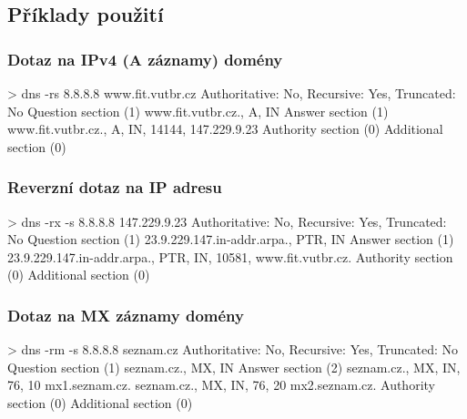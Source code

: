 \documentclass[a4paper,12pt]{article}
\begin{document}
\newpage
\subsection{Příklady použití}
\subsubsection{Dotaz na IPv4 (A záznamy) domény}
\begin{cppcode}
> dns -rs 8.8.8.8 www.fit.vutbr.cz
Authoritative: No, Recursive: Yes, Truncated: No
Question section (1)
  www.fit.vutbr.cz., A, IN
Answer section (1)
  www.fit.vutbr.cz., A, IN, 14144, 147.229.9.23
Authority section (0)
Additional section (0)
\end{cppcode}

\subsubsection{Reverzní dotaz na IP adresu}
\begin{cppcode}
> dns -rx -s 8.8.8.8 147.229.9.23
Authoritative: No, Recursive: Yes, Truncated: No
Question section (1)
  23.9.229.147.in-addr.arpa., PTR, IN
Answer section (1)
  23.9.229.147.in-addr.arpa., PTR, IN, 10581, www.fit.vutbr.cz.
Authority section (0)
Additional section (0)
\end{cppcode}

\subsubsection{Dotaz na MX záznamy domény}
\begin{cppcode}
> dns -rm -s 8.8.8.8 seznam.cz
Authoritative: No, Recursive: Yes, Truncated: No
Question section (1)
  seznam.cz., MX, IN
Answer section (2)
  seznam.cz., MX, IN, 76, 10 mx1.seznam.cz.
  seznam.cz., MX, IN, 76, 20 mx2.seznam.cz.
Authority section (0)
Additional section (0)
\end{cppcode}
\end{document}
